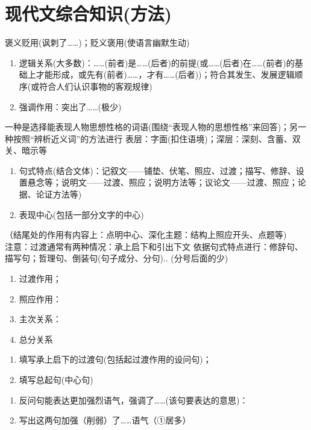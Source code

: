 \section{现代文综合知识(方法)}
  褒义贬用(讽刺了\ldots{}\ldots{})；贬义褒用(使语言幽默生动)
\begin{enumerate}
\item 逻辑关系(大多数)：\ldots{}\ldots{}(前者)是\ldots{}\ldots{}(后者)的前提(或\ldots{}\ldots{}(后者)在\ldots{}\ldots{}(前者)的基础上才能形成，或先有(前者)\ldots{}\ldots{}，才有\ldots{}\ldots{}(后者))；符合其发生、发展逻辑顺序(或符合人们认识事物的客观规律)
\item 强调作用：突出了\ldots{}\ldots{}(极少)
\end{enumerate}
  一种是选择能表现人物思想性格的词语(围绕``表现人物的思想性格''来回答)；另一种按照``辨析近义词''的方法进行
  表层：字面(扣住语境)；深层：深刻、含蓄、双关、暗示等
\begin{enumerate}
\item 句式特点(结合文体)：记叙文——铺垫、伏笔、照应、过渡；描写、修辞、设置悬念等；说明文——过渡、照应；说明方法等；议论文——过渡、照应；论据、论证方法等)
\item 表现中心(包括一部分文字的中心)
\end{enumerate}
（结尾处的作用有内容上：点明中心、深化主题：结构上照应开头、点题等)
\\注意：过渡通常有两种情况：承上启下和引出下文
依据句式特点进行：修辞句、描写句；哲理句、倒装句(句子成分、分句)..
(分号后面的少)
\begin{enumerate}
\item 过渡作用；
\item 照应作用：
\item 主次关系：
\item 总分关系
\end{enumerate}
\begin{enumerate}
\item 填写承上启下的过渡句(包括起过渡作用的设问句)；
 \item 填写总起句(中心句)
\end{enumerate}
\begin{enumerate}
\item 反问句能表达更加强烈语气，强调了\ldots{}\ldots{}(该句要表达的意思)：
\item 写出这两句加强（削弱）了\ldots{}\ldots{}语气（①居多）
\end{enumerate}
